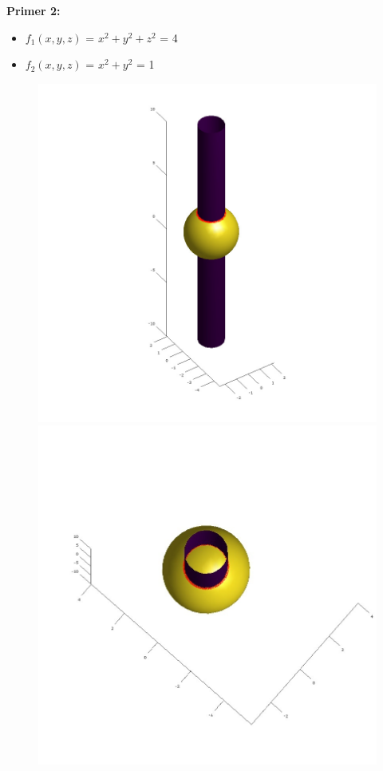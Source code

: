 \documentclass[12pt]{article}
\begin{document}
	\begin{minipage}{\textwidth}
		\textbf{\large{Primer 2:}}
		\begin{itemize}  
			\item $f_{1}(x,y,z)$ = $x^2 + y^2 + z^2$ = 4
			\item $f_{2}(x,y,z)$ = $x^2 + y^2$ = 1
		\end{itemize}
		\begin{figure}[H]
			\centering
			\includegraphics[scale=0.3]{primer2_1}
			\includegraphics[scale=0.3]{primer2_2}
		\end{figure}
	\end{minipage}
	
\end{document}
